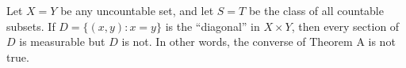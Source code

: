 Let $X = Y$ be any uncountable set, and let $S = T$ be the class of all countable subsets. If $D = \{(x,y) : x = y\}$ is the ``diagonal'' in $X \times Y$, then every section of $D$ is measurable but $D$ is not. In other words, the converse of Theorem A is not true.
